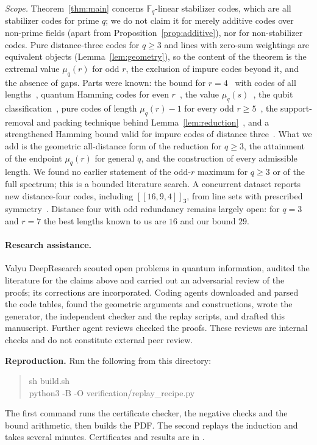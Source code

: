 \documentclass[11pt]{amsart}
\theoremstyle{definition}
\theoremstyle{remark}
\newcommand{\F}{\mathbb F}
\newcommand{\qq}[1]{[\![#1]\!]}
\begin{document}
\emph{Scope.} Theorem~\ref{thm:main} concerns $\F_q$-linear stabilizer codes, which are all stabilizer codes for prime $q$; we do not claim it for merely additive codes over non-prime fields (apart from Proposition~\ref{prop:additive}), nor for non-stabilizer codes. Pure distance-three codes for $q\ge3$ and lines with zero-sum weightings are equivalent objects (Lemma~\ref{lem:geometry}), so the content of the theorem is the extremal value $\mu_q(r)$ for odd $r$, the exclusion of impure codes beyond it, and the absence of gaps. Parts were known: the bound for $r=4$~\cite{HuberGrassl2020} with codes of all lengths~\cite{LiXu2010,GrasslRoetteler2015,BallCentellesHuber2023}, quantum Hamming codes for even $r$~\cite{BierbrauerEdel2000,KKKS2006}, the value $\mu_q(s)$~\cite{Beutelspacher1975,NastaseSissokho2017}, the qubit classification~\cite{YuEtAl2013}, pure codes of length $\mu_q(r)-1$ for every odd $r\ge5$~\cite{BierbrauerEdel2000}, the support-removal and packing technique behind Lemma~\ref{lem:reduction}~\cite{Gottesman1997,NemecTansuwannont2023}, and a strengthened Hamming bound valid for impure codes of distance three~\cite{YuLaiOh2010}. What we add is the geometric all-distance form of the reduction for $q\ge3$, the attainment of the endpoint $\mu_q(r)$ for general $q$, and the construction of every admissible length. We found no earlier statement of the odd-$r$ maximum for $q\ge3$ or of the full spectrum; this is a bounded literature search. A concurrent dataset reports new distance-four codes, including $\qq{16,9,4}_3$, from line sets with prescribed symmetry~\cite{Farhan2026}. Distance four with odd redundancy remains largely open: for $q=3$ and $r=7$ the best lengths known to us are $16$ and our bound $29$.

\paragraph{Research assistance.}
Valyu DeepResearch scouted open problems in quantum information, audited the literature for the claims above and carried out an adversarial review of the proofs; its corrections are incorporated. Coding agents downloaded and parsed the code tables, found the geometric arguments and constructions, wrote the generator, the independent checker and the replay scripts, and drafted this manuscript. Further agent reviews checked the proofs. These reviews are internal checks and do not constitute external peer review.

\smallskip
\noindent\textbf{Reproduction.} Run the following from this directory:
\begin{quote}\small\ttfamily
sh build.sh\\
python3 -B -O verification/replay\_recipe.py
\end{quote}
The first command runs the certificate checker, the negative checks and the bound arithmetic, then builds the PDF. The second replays the induction and takes several minutes. Certificates and results are in .



\end{document}
